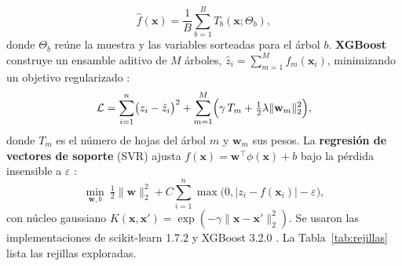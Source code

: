 \documentclass[pdflatex,sn-mathphys-num]{sn-jnl}
\begin{document}
\begin{equation}
\hat{f}(\mathbf{x})=\frac{1}{B}\sum_{b=1}^{B}T_b(\mathbf{x};\Theta_b),
\label{eq:rf}
\end{equation}
donde $\Theta_b$ reúne la muestra y las variables sorteadas para el árbol $b$. \textbf{XGBoost} construye un ensamble aditivo de $M$ árboles, $\hat{z}_i=\sum_{m=1}^{M}f_m(\mathbf{x}_i)$, minimizando un objetivo regularizado \cite{chen2016}:
\begin{equation}
\mathcal{L}=\sum_{i=1}^{n}\bigl(z_i-\hat{z}_i\bigr)^2+\sum_{m=1}^{M}\Bigl(\gamma\,T_m+\tfrac{1}{2}\lambda\lVert\mathbf{w}_m\rVert_2^2\Bigr),
\label{eq:xgb}
\end{equation}
donde $T_m$ es el número de hojas del árbol $m$ y $\mathbf{w}_m$ sus pesos. La \textbf{regresión de vectores de soporte} (SVR) ajusta $f(\mathbf{x})=\mathbf{w}^{\top}\phi(\mathbf{x})+b$ bajo la pérdida insensible a $\varepsilon$ \cite{drucker1997}:
\begin{equation}
\min_{\mathbf{w},b}\ \tfrac{1}{2}\lVert\mathbf{w}\rVert_2^2+C\sum_{i=1}^{n}\max\bigl(0,\lvert z_i-f(\mathbf{x}_i)\rvert-\varepsilon\bigr),
\label{eq:svr}
\end{equation}
con núcleo gaussiano $K(\mathbf{x},\mathbf{x}')=\exp(-\gamma\lVert\mathbf{x}-\mathbf{x}'\rVert_2^2)$. Se usaron las implementaciones de scikit-learn 1.7.2 \cite{pedregosa2011} y XGBoost 3.2.0 \cite{chen2016}. La Tabla~\ref{tab:rejillas} lista las rejillas exploradas.
\end{document}
